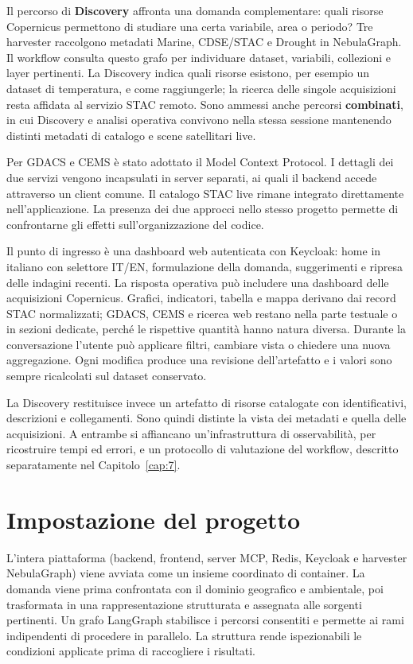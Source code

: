 Il percorso di \textbf{Discovery} affronta una domanda complementare: quali
risorse Copernicus permettono di studiare una certa variabile, area o periodo?
Tre harvester raccolgono metadati Marine, CDSE/STAC e Drought in NebulaGraph.
Il workflow consulta questo grafo per individuare dataset, variabili,
collezioni e layer pertinenti. La Discovery indica quali risorse esistono, per
esempio un dataset di temperatura, e come raggiungerle; la ricerca delle
singole acquisizioni resta affidata al servizio STAC remoto. Sono ammessi anche
percorsi \textbf{combinati}, in cui Discovery e analisi operativa convivono
nella stessa sessione mantenendo distinti metadati di catalogo e scene
satellitari live.

Per GDACS e CEMS è stato adottato il Model Context Protocol. I dettagli dei due
servizi vengono incapsulati in server separati, ai quali il backend accede
attraverso un client comune. Il catalogo STAC live rimane integrato direttamente
nell'applicazione. La presenza dei due approcci nello stesso progetto permette
di confrontarne gli effetti sull'organizzazione del codice.

Il punto di ingresso è una dashboard web autenticata con Keycloak: home in
italiano con selettore IT/EN, formulazione della domanda, suggerimenti e
ripresa delle indagini recenti. La risposta operativa può includere una
dashboard delle acquisizioni Copernicus. Grafici, indicatori, tabella e mappa
derivano dai record STAC normalizzati; GDACS, CEMS e ricerca web restano nella
parte testuale o in sezioni dedicate, perché le rispettive quantità hanno
natura diversa. Durante la conversazione l'utente può applicare filtri, cambiare
vista o chiedere una nuova aggregazione. Ogni modifica produce una revisione
dell'artefatto e i valori sono sempre ricalcolati sul dataset conservato.

La Discovery restituisce invece un artefatto di risorse catalogate con
identificativi, descrizioni e collegamenti. Sono quindi distinte la vista dei
metadati e quella delle acquisizioni. A entrambe si affiancano un'infrastruttura
di osservabilità, per ricostruire tempi ed errori, e un protocollo di
valutazione del workflow, descritto separatamente nel Capitolo~\ref{cap:7}.

\section{Impostazione del progetto}

L'intera piattaforma (backend, frontend, server MCP, Redis, Keycloak e
harvester NebulaGraph) viene avviata come un insieme coordinato di container.
La domanda viene prima confrontata con il dominio geografico e ambientale, poi
trasformata in una rappresentazione strutturata e assegnata alle sorgenti
pertinenti. Un grafo LangGraph stabilisce i percorsi consentiti e permette ai
rami indipendenti di procedere in parallelo. La struttura rende ispezionabili
le condizioni applicate prima di raccogliere i risultati.

